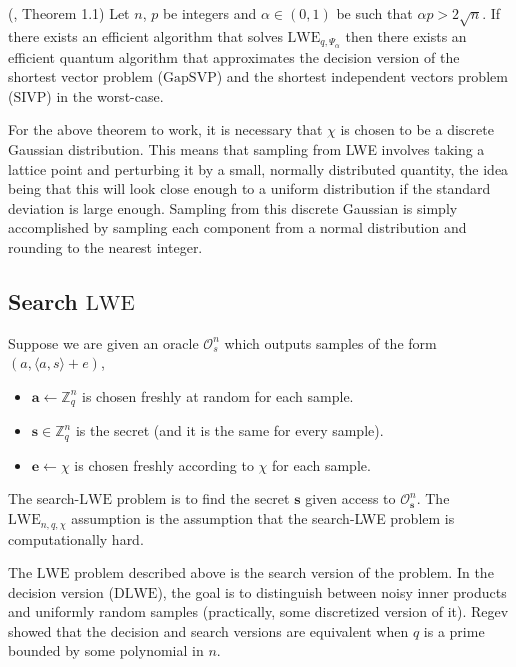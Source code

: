 \begin{theorem}
\normalfont
(\cite{Regev:2005:LLE:1060590.1060603}, Theorem 1.1)
Let $n$, $p$ be integers and $\alpha \in (0, 1)$ be such that $\alpha p > 2 \sqrt{n}$. If there exists an efficient algorithm that solves ${\mathrm{LWE}}_{{q,\Psi_{\alpha }}}$ then there exists an efficient quantum algorithm that approximates the decision version of the shortest vector problem (${\mathrm{GapSVP}}$) and the shortest independent vectors problem (${\mathrm{SIVP}}$) in the worst-case.
\end{theorem}

For the above theorem to work, it is necessary that $\chi$ is chosen to be a discrete Gaussian distribution. This means that sampling from LWE involves taking a lattice point and perturbing it by a small, normally distributed quantity, the idea being that this will look close enough to a uniform distribution if the standard deviation is large enough. Sampling from this discrete Gaussian is simply accomplished by sampling each component from a normal distribution and rounding to the nearest integer.

\subsection{Search \texorpdfstring{$\mathrm{LWE}$}{LWE}}

Suppose we are given an oracle $\mathcal{O}^n_s$ which outputs samples of the form $(a, \langle a, s \rangle + e)$,

\begin{itemize}
\item $\textbf{a} \leftarrow \mathbb{Z}^n_{q}$ is chosen freshly at random for each sample.
\item $\textbf{s} \in \mathbb{Z}^n_{q}$ is the secret (and it is the same for every sample).
\item $\textbf{e} \leftarrow \chi$ is chosen freshly according to $\chi$ for each sample.
\end{itemize}


The search-$\mathrm{LWE}$ problem is to find the secret $\textbf{s}$ given access to $\mathcal{O}^{n}_{\textbf{s}}$. The $\mathrm{LWE}_{n,q,\chi}$ assumption is the assumption that the search-LWE problem is computationally hard.


The $\mathrm{LWE}$ problem described above is the search version of the problem. In the decision version ($\mathrm{DLWE}$), the goal is to distinguish between noisy inner products and uniformly random samples (practically, some discretized version of it). Regev \cite{Regev:2005:LLE:1060590.1060603} showed that the decision and search versions are equivalent when $q$ is a prime bounded by some polynomial in $n$.


